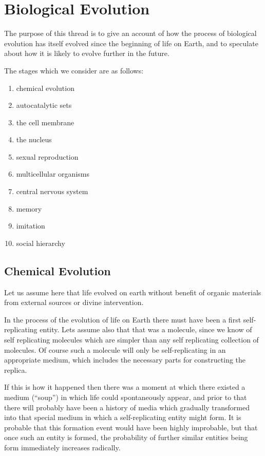 \section{Biological Evolution}

The purpose of this thread is to give an account of how the process of biological evolution has itself evolved since the beginning of life on Earth, and to speculate about how it is likely to evolve further in the future.

The stages which we consider are as follows:

\begin{enumerate}
\item chemical evolution
\item autocatalytic sets
\item the cell membrane
\item the nucleus
\item sexual reproduction
\item multicellular organisms
\item central nervous system
\item memory
\item imitation
\item social hierarchy
\end{enumerate}

\subsection{Chemical Evolution}

Let us assume here that life evolved on earth without benefit of organic materials from external sources or divine intervention.

In the process of the evolution of life on Earth there must have been a first self-replicating entity.
Lets assume also that that was a molecule, since we know of self replicating molecules which are simpler than any self replicating collection of molecules.
Of course such a molecule will only be self-replicating in an appropriate medium, which includes the necessary parts for constructing the replica.

If this is how it happened then there was a moment at which there existed a medium (``soup'') in which life could spontaneously appear, and prior to that there will probably have been a history of media which gradually transformed into that special medium in which a self-replicating entity might form.
It is probable that this formation event would have been highly improbable, but that once such an entity is formed, the probability of further similar entities being form immediately increases radically.

